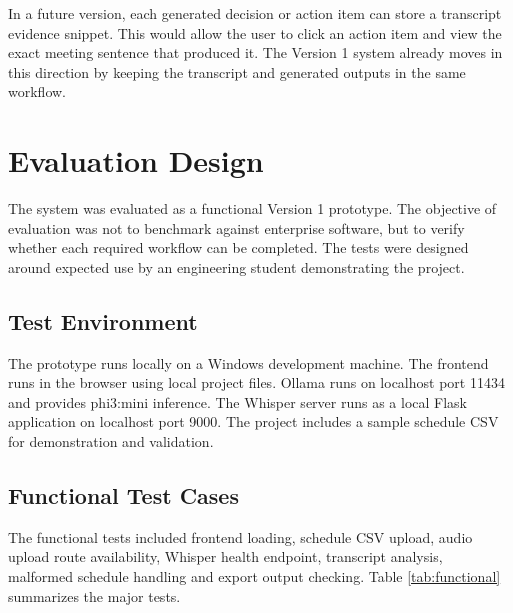 \documentclass[11pt,a4paper]{article}
\begin{document}
In a future version, each generated decision or action item can store a transcript evidence snippet. This would allow the user to click an action item and view the exact meeting sentence that produced it. The Version 1 system already moves in this direction by keeping the transcript and generated outputs in the same workflow.

\section{Evaluation Design}

The system was evaluated as a functional Version 1 prototype. The objective of evaluation was not to benchmark against enterprise software, but to verify whether each required workflow can be completed. The tests were designed around expected use by an engineering student demonstrating the project.

\subsection{Test Environment}

The prototype runs locally on a Windows development machine. The frontend runs in the browser using local project files. Ollama runs on localhost port 11434 and provides phi3:mini inference. The Whisper server runs as a local Flask application on localhost port 9000. The project includes a sample schedule CSV for demonstration and validation.

\subsection{Functional Test Cases}

The functional tests included frontend loading, schedule CSV upload, audio upload route availability, Whisper health endpoint, transcript analysis, malformed schedule handling and export output checking. Table \ref{tab:functional} summarizes the major tests.
\end{document}
